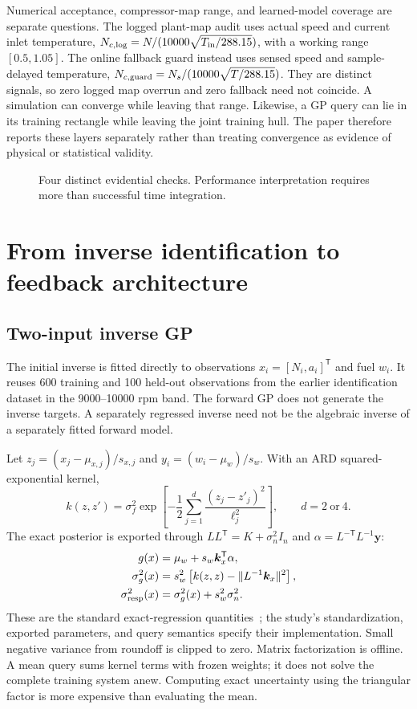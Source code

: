 Numerical acceptance, compressor-map range, and learned-model coverage are separate questions. The logged plant-map audit uses actual speed and current inlet temperature,
$N_{c,\rm log}=N/(10000\sqrt{T_{\rm in}/288.15})$, with a working range $[0.5,1.05]$.
The online fallback guard instead uses sensed speed and sample-delayed temperature,
$N_{c,\rm guard}=N_s/(10000\sqrt{T/288.15})$.
They are distinct signals, so zero logged map overrun and zero fallback need not coincide. A simulation can converge while leaving that range. Likewise, a GP query can lie in its training rectangle while leaving the joint training hull. The paper therefore reports these layers separately rather than treating convergence as evidence of physical or statistical validity.
\begin{figure}[htbp]\centering\diagramEvidence
\caption{Four distinct evidential checks. Performance interpretation requires more than successful time integration.}\label{fig:evidence}\end{figure}




\section{From inverse identification to feedback architecture}
\subsection{Two-input inverse GP}
The initial inverse is fitted directly to observations $x_i=[N_i,a_i]^\mathsf T$ and fuel $w_i$. It reuses 600 training and 100 held-out observations from the earlier identification dataset in the 9000--10000 rpm band. The forward GP does not generate the inverse targets. A separately regressed inverse need not be the algebraic inverse of a separately fitted forward model.

Let $z_j=(x_j-\mu_{x,j})/s_{x,j}$ and $y_i=(w_i-\mu_w)/s_w$. With an ARD squared-exponential kernel,
\begin{equation}
k(z,z')=\sigma_f^2\exp\!\left[-\frac12\sum_{j=1}^{d}\frac{(z_j-z'_j)^2}{\ell_j^2}\right],\qquad d=2\ \text{or}\ 4.
\end{equation}
The exact posterior is exported through $LL^\mathsf T=K+\sigma_n^2I_n$ and $\alpha=L^{-\mathsf T}L^{-1}\bm y$:
\begin{align}
g(x)&=\mu_w+s_w\bm k_x^\mathsf T\alpha,\\
\sigma_g^2(x)&=s_w^2\left[k(z,z)-\|L^{-1}\bm k_x\|^2\right],\\
\sigma_{\rm resp}^2(x)&=\sigma_g^2(x)+s_w^2\sigma_n^2.
\label{eq:gpvariance}
\end{align}
These are the standard exact-regression quantities~\cite{gpml}; the study's standardization, exported parameters, and query semantics specify their implementation. Small negative variance from roundoff is clipped to zero. Matrix factorization is offline. A mean query sums kernel terms with frozen weights; it does not solve the complete training system anew. Computing exact uncertainty using the triangular factor is more expensive than evaluating the mean.


